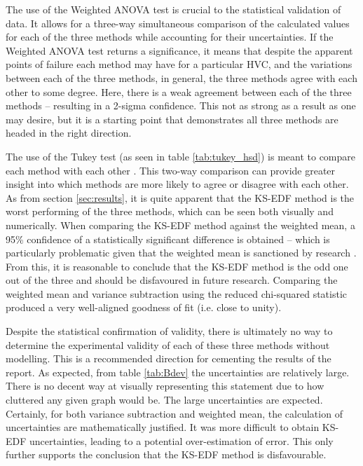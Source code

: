 The use of the Weighted ANOVA test is crucial to the statistical validation of data. It allows for a three-way simultaneous comparison of the calculated values for each of the three methods while accounting for their uncertainties. If the Weighted ANOVA test returns a significance, it means that despite the apparent points of failure each method may have for a particular HVC, and the variations between each of the three methods, in general, the three methods agree with each other to some degree. Here, there is a weak agreement between each of the three methods – resulting in a 2-sigma confidence. This not as strong as a result as one may desire, but it is a starting point that demonstrates all three methods are headed in the right direction.


The use of the Tukey test (as seen in table \ref{tab:tukey_hsd}) is meant to compare each method with each other \citep{ID77, ID78}. This two-way comparison can provide greater insight into which methods are more likely to agree or disagree with each other. As from section \ref{sec:results}, it is quite apparent that the KS-EDF method is the worst performing of the three methods, which can be seen both visually and numerically. When comparing the KS-EDF method against the weighted mean, a 95\% confidence of a statistically significant difference is obtained – which is particularly problematic given that the weighted mean is sanctioned by research \citep{ID5, ID26}. From this, it is reasonable to conclude that the KS-EDF method is the odd one out of the three and should be disfavoured in future research. Comparing the weighted mean and variance subtraction using the reduced chi-squared statistic produced a very well-aligned goodness of fit (i.e. close to unity).


Despite the statistical confirmation of validity, there is ultimately no way to determine the experimental validity of each of these three methods without modelling. This is a recommended direction for cementing the results of the report. As expected, from table \ref{tab:Bdev} the uncertainties are relatively large. There is no decent way at visually representing this statement due to how cluttered any given graph would be. The large uncertainties are expected. Certainly, for both variance subtraction and weighted mean, the calculation of uncertainties are mathematically justified. It was more difficult to obtain KS-EDF uncertainties, leading to a potential over-estimation of error. This only further supports the conclusion that the KS-EDF method is disfavourable.


